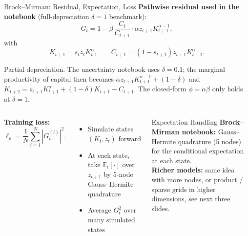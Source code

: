 \documentclass[aspectratio=169,11pt]{beamer}
\newcommand{\emphc}[1]{\textcolor{harvardcrimson}{#1}}
\begin{document}
\begin{frame}[shrink=10]{Brock--Mirman: Residual, Expectation, Loss}
\textbf{Pathwise residual used in the notebook} (full-depreciation $\delta=1$ benchmark):
\[
G_t = 1 - \beta \, \frac{C_t}{C_{t+1}} \cdot \alpha z_{t+1} K_{t+1}^{\alpha-1},
\]
with
\[
K_{t+1} = s_t z_t K_t^\alpha, \qquad
C_{t+1} = (1-s_{t+1}) z_{t+1} K_{t+1}^\alpha.
\]

\vspace{-0.2em}
{\scriptsize\emphc{Partial depreciation.}  The uncertainty notebook uses $\delta=0.1$; the marginal productivity of capital then becomes $\alpha z_{t+1} K_{t+1}^{\alpha-1} + (1-\delta)$ and $K_{t+2} = z_{t+1} K_{t+1}^{\alpha} + (1-\delta) K_{t+1} - C_{t+1}$.  The closed-form $\phi = \alpha\beta$ only holds at $\delta=1$.}

\vspace{0.3em}
\begin{columns}[T]
\textbf{Training loss:}
\[
\ell_\rho = \frac{1}{N}\sum_{i=1}^{N} |G_t^{(i)}|^2.
\]

\begin{itemize}
    \setlength{\itemsep}{1pt}
    \item Simulate states $(K_t,z_t)$ forward
    \item At each state, take $\mathbb{E}_t[\cdot]$ over $z_{t+1}$ by 5-node Gauss--Hermite quadrature
    \item Average $G_t^2$ over many simulated states
\end{itemize}

\begin{block}{Expectation Handling}
\small
\textbf{Brock--Mirman notebook:} \emphc{Gauss--Hermite quadrature} (5 nodes) for the conditional expectation at each state.\\[2pt]
\textbf{Richer models:} same idea with more nodes, or product / sparse grids in higher dimensions, see next three slides.
\end{block}
\end{columns}
\end{frame}

\end{document}

